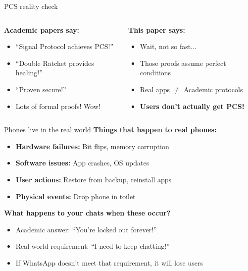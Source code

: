 \documentclass[aspectratio=169, lualatex, handout]{beamer}
\begin{document}
\begin{frame}{PCS reality check}
	\begin{columns}[c]
		\begin{column}{0.5\textwidth}
			\textbf{Academic papers say:}
			\begin{itemize}
				\item ``Signal Protocol achieves PCS!''
				\item ``Double Ratchet provides healing!''
				\item ``Proven secure!''
				\item Lots of formal proofs! Wow!
			\end{itemize}
		\end{column}
		\begin{column}{0.5\textwidth}
			\textbf{This paper says:}
			\begin{itemize}
				\item Wait, not so fast...
				\item Those proofs assume perfect conditions
				\item Real apps $\neq$ Academic protocols
				\item \textbf{Users don't actually get PCS!}
			\end{itemize}
		\end{column}
	\end{columns}
\end{frame}

\begin{frame}{Phones live in the real world}
	\textbf{Things that happen to real phones:}
	\begin{itemize}
		\item \textbf{Hardware failures:} Bit flips, memory corruption
		\item \textbf{Software issues:} App crashes, OS updates
		\item \textbf{User actions:} Restore from backup, reinstall apps
		\item \textbf{Physical events:} Drop phone in toilet
	\end{itemize}
	\textbf{What happens to your chats when these occur?}
	\begin{itemize}
		\item Academic answer: ``You're locked out forever!''
		\item Real-world requirement: ``I need to keep chatting!''
		\item If WhatsApp doesn't meet that requirement, it will lose users
	\end{itemize}
\end{frame}
\end{document}
